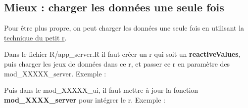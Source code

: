 \documentclass[
  letterpaper,
  DIV=11,
  numbers=noendperiod]{scrreprt}
\newenvironment{Shaded}{\begin{snugshade}}{\end{snugshade}}
\newcommand{\AttributeTok}[1]{\textcolor[rgb]{0.40,0.45,0.13}{#1}}
\newcommand{\CommentTok}[1]{\textcolor[rgb]{0.37,0.37,0.37}{#1}}
\newcommand{\ControlFlowTok}[1]{\textcolor[rgb]{0.00,0.23,0.31}{#1}}
\newcommand{\FunctionTok}[1]{\textcolor[rgb]{0.28,0.35,0.67}{#1}}
\newcommand{\NormalTok}[1]{\textcolor[rgb]{0.00,0.23,0.31}{#1}}
\newcommand{\OtherTok}[1]{\textcolor[rgb]{0.00,0.23,0.31}{#1}}
\newcommand{\SpecialCharTok}[1]{\textcolor[rgb]{0.37,0.37,0.37}{#1}}
\newcommand{\StringTok}[1]{\textcolor[rgb]{0.13,0.47,0.30}{#1}}
\begin{document}
\hypertarget{mieux-charger-les-donnuxe9es-une-seule-fois}{%
\subsection{Mieux : charger les données une seule
fois}\label{mieux-charger-les-donnuxe9es-une-seule-fois}}

Pour être plus propre, on peut charger les données une seule fois en
utilisant la
\href{https://rtask.thinkr.fr/fr/la-communication-entre-modules-et-ses-caprices/}{technique
du petit r}.

Dans le fichier R/app\_server.R il faut créer un r qui soit un
\textbf{reactiveValues}, puis charger les jeux de données dans ce r, et
passer ce r en paramètre des mod\_XXXXX\_server. Exemple :

\begin{Shaded}
\end{Shaded}

Puis dans le mod\_XXXXX\_ui, il faut mettre à jour la fonction
\textbf{mod\_XXXX\_server} pour intégrer le r. Exemple :
\end{document}
